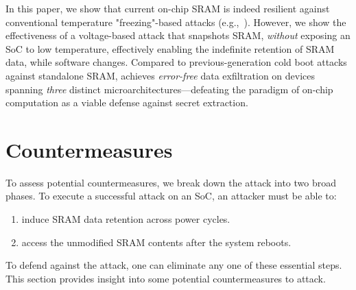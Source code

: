 In this paper, we show that current on-chip SRAM is indeed resilient against conventional temperature "freezing"-based attacks (e.g.,~\cite{anagnostopoulos2018low}). However, we show the effectiveness of a voltage-based attack that snapshots SRAM, \emph{without} exposing an SoC to low temperature, effectively enabling the indefinite retention of SRAM data, while software changes.
Compared to previous-generation cold boot attacks against standalone SRAM, \sys{} achieves \emph{error-free} data exfiltration on devices spanning \textit{three} distinct microarchitectures---defeating the paradigm of on-chip computation as a viable defense against secret extraction.


\section{Countermeasures}
\label{sec_counter}

To assess potential countermeasures, we break down the \sys{} attack into two broad phases.
To execute a successful \sys{} attack on an SoC, an attacker must be able to:
\begin{enumerate}
    \item induce SRAM data retention across power cycles.
    \item access the unmodified SRAM contents after the system reboots.
\end{enumerate}

To defend against the attack, one can eliminate any one of these essential steps.
This section provides insight into some potential countermeasures to \sys{} attack.  


